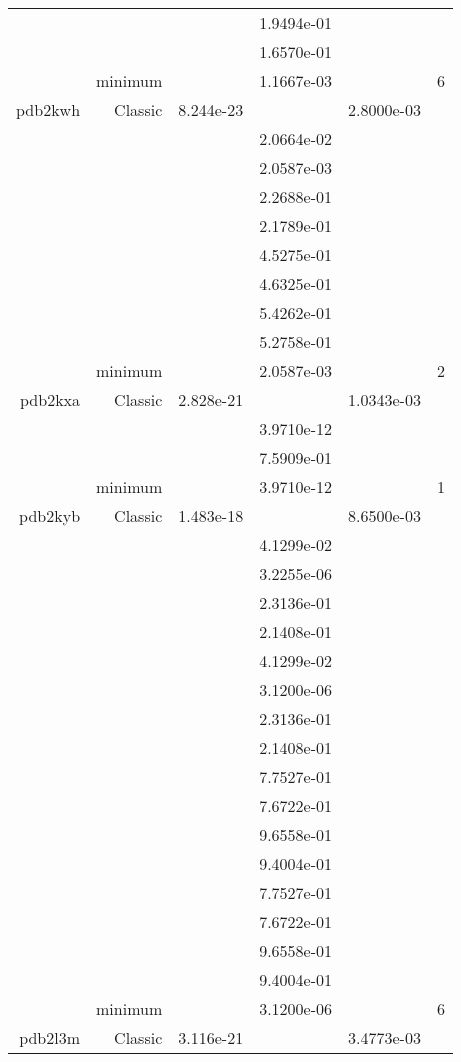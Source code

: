 \begin{xltabular}{\textwidth}{r|rS[table-format=1.3e+2]S[table-format=1.4e+2]S[table-format=1.4e+2]S[table-format=-1.5]}
&  &  & 1.9494e-01 & & \\
&  &  & 1.6570e-01 & & \\
& minimum &  & 1.1667e-03 & & 6 \\  \addlinespace
pdb2kwh & Classic & 8.244e-23 &  & 2.8000e-03 & \\
&  &  & 2.0664e-02 & & \\
&  &  & 2.0587e-03 & & \\
&  &  & 2.2688e-01 & & \\
&  &  & 2.1789e-01 & & \\
&  &  & 4.5275e-01 & & \\
&  &  & 4.6325e-01 & & \\
&  &  & 5.4262e-01 & & \\
&  &  & 5.2758e-01 & & \\
& minimum &  & 2.0587e-03 & & 2 \\  \addlinespace
pdb2kxa & Classic & 2.828e-21 &  & 1.0343e-03 & \\
&  &  & 3.9710e-12 & & \\
&  &  & 7.5909e-01 & & \\
& minimum &  & 3.9710e-12 & & 1 \\  \addlinespace
pdb2kyb & Classic & 1.483e-18 &  & 8.6500e-03 & \\
&  &  & 4.1299e-02 & & \\
&  &  & 3.2255e-06 & & \\
&  &  & 2.3136e-01 & & \\
&  &  & 2.1408e-01 & & \\
&  &  & 4.1299e-02 & & \\
&  &  & 3.1200e-06 & & \\
&  &  & 2.3136e-01 & & \\
&  &  & 2.1408e-01 & & \\
&  &  & 7.7527e-01 & & \\
&  &  & 7.6722e-01 & & \\
&  &  & 9.6558e-01 & & \\
&  &  & 9.4004e-01 & & \\
&  &  & 7.7527e-01 & & \\
&  &  & 7.6722e-01 & & \\
&  &  & 9.6558e-01 & & \\
&  &  & 9.4004e-01 & & \\
& minimum &  & 3.1200e-06 & & 6 \\  \addlinespace
pdb2l3m & Classic & 3.116e-21 &  & 3.4773e-03 & \\

\end{xltabular}
